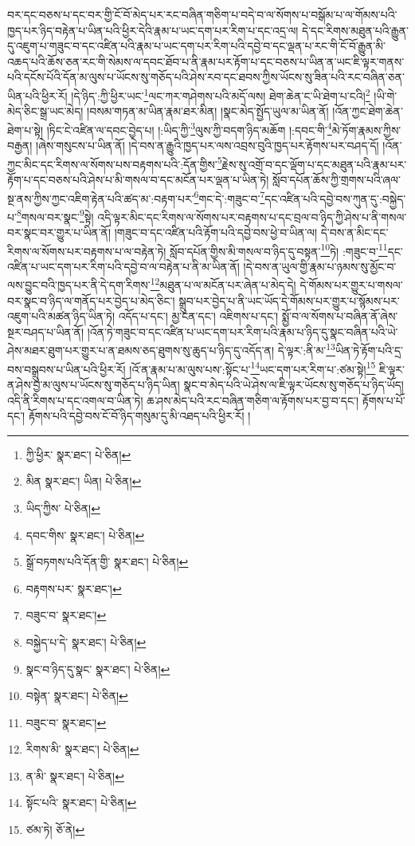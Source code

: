 བར་དང་བཅས་པ་དང་བར་གྱི་ངོ་བོ་མེད་པར་རང་བཞིན་གཅིག་པ་བདེ་བ་ལ་སོགས་པ་བསྒོམ་པ་ལ་གོམས་པའི་ཁྱད་པར་ཉིད་བརྟེན་པ་ཡིན་པའི་ཕྱིར་དེའི་རྣམ་པ་ཡང་དག་པར་རིག་པ་དང་འདྲ་ལ། དེ་དང་རིགས་མཐུན་པའི་རྒྱུན་དུ་འཇུག་པ་གཟུང་བ་དང་འཛིན་པའི་རྣམ་པ་ཡང་དག་པར་རིག་པའི་དབྱེ་བ་དང་ལྡན་པ་རང་གི་ངོ་བོ་རྒྱུན་མི་འཆད་པའི་ཆོས་ཅན་རང་གི་སེམས་ལ་དབང་ཐོབ་པ་ནི་རྣམ་པར་རྟོག་པ་དང་བཅས་པ་ཡིན་ན་ཡང་ཇི་ལྟར་གནས་པའི་དངོས་པོའི་དོན་མ་ལུས་པ་ཡོངས་སུ་གཅོད་པའི་ཤེས་རབ་དང་ཐབས་ཀྱིས་ཡོངས་སུ་ཟིན་པའི་རང་བཞིན་ཅན་ཡིན་པའི་ཕྱིར་རོ། །དེ་ཉིད་:ཀྱི་ཕྱིར་ཡང་\footnote{ཀྱི་ཕྱིར་  སྣར་ཐང་།  པེ་ཅིན། }ལང་ཀར་གཤེགས་པའི་མདོ་ལས། ཐེག་ཆེན་ང་ཡི་ཐེག་པ་ངའི།\footnote{མིན  སྣར་ཐང་། ཡིན།  པེ་ཅིན། } །ཡི་གེ་མེད་ཅིང་སྒྲ་ཡང་མེད། །བསམ་གཏན་མ་ཡིན་རྣམ་ཐར་མིན། །སྣང་མེད་སྤྱོད་ཡུལ་མ་ཡིན་ནོ། །འོན་ཀྱང་ཐེག་ཆེན་ཐེག་པ་སྟེ། །ཏིང་ངེ་འཛིན་ལ་དབང་བྱེད་པ། །:ཡིད་ཀྱི་\footnote{ཡིད་ཀྱིས་  པེ་ཅིན། }ལུས་ཀྱི་བདག་ཉིད་མཆོག །:དབང་གི་\footnote{དབང་གིས་  སྣར་ཐང་།  པེ་ཅིན། }མེ་ཏོག་རྣམས་ཀྱིས་བརྒྱན། །ཞེས་གསུངས་པ་ཡིན་ནོ། །དེ་བས་ན་རྒྱུའི་ཁྱད་པར་ལས་འབྲས་བུའི་ཁྱད་པར་རྟོགས་པར་བཤད་དོ། །འོན་ཀྱང་མིང་དང་རིགས་ལ་སོགས་པས་བརྟགས་པའི་:དོན་གྱིས་\footnote{སྒྲོ་བཏགས་པའི་དོན་གྱི་  སྣར་ཐང་།  པེ་ཅིན། }རྗེས་སུ་འགྲོ་བ་དང་ལྡོག་པ་དང་མཐུན་པའི་རྣམ་པར་རྟོག་པ་དང་བཅས་པའི་ཤེས་པ་མི་གསལ་བ་དང་མངོན་པར་ལྡན་པ་ཡིན་ཏེ། སློབ་དཔོན་ཆོས་ཀྱི་གྲགས་པའི་ཞལ་སྔ་ནས་ཀྱིས་ཀྱང་འཇིག་རྟེན་པའི་ཚད་མ་:བརྟག་པར་\footnote{བརྟགས་པར་  སྣར་ཐང་། }གང་དེ་:གཟུང་བ་\footnote{བཟུང་བ་  སྣར་ཐང་། }དང་འཛིན་པའི་དབྱེ་བས་ཀུན་དུ་:བསྐྱེད་པ་\footnote{བསྐྱེད་པ་དེ་  སྣར་ཐང་།  པེ་ཅིན། }གསལ་བར་སྣང་\footnote{སྣང་བ་ཉིད་དུ་སྣང་  སྣར་ཐང་།  པེ་ཅིན། }སྟེ། འདི་ལྟར་མིང་དང་རིགས་ལ་སོགས་པར་བརྟགས་པ་དང་བྲལ་བ་ཉིད་ཀྱི་ཤེས་པ་ནི་གསལ་བར་སྣང་བར་གྱུར་པ་ཡིན་ནོ། །གཟུང་བ་དང་འཛིན་པའི་རྟོག་པའི་དབྱེ་བས་ཕྱེ་བ་ཡིན་ལ། དེ་བས་ན་མིང་དང་རིགས་ལ་སོགས་པར་བརྟགས་པ་ལ་བརྟེན་ཏེ། སློབ་དཔོན་གྱིས་མི་གསལ་བ་ཉིད་དུ་བསྟན་\footnote{བསྟེན་  སྣར་ཐང་།  པེ་ཅིན། }ཏེ། :གཟུང་བ་\footnote{བཟུང་བ་  སྣར་ཐང་། }དང་འཛིན་པ་ཡང་དག་པར་རིག་པའི་དབྱེ་བ་ལ་བརྟེན་པ་ནི་མ་ཡིན་ནོ། །དེ་བས་ན་ཡུལ་གྱི་རྣམ་པ་ཉམས་སུ་མྱོང་བ་ལས་བྱུང་བའི་ཁྱད་པར་ནི་དེ་དག་རིགས་\footnote{རིགས་མི་  སྣར་ཐང་།  པེ་ཅིན། }མཐུན་པ་ལ་མངོན་པར་ཞེན་པ་མེད་དེ། དེ་གོམས་པར་གྱུར་པ་གསལ་བར་སྣང་བ་ཉིད་ལ་གནོད་པར་བྱེད་པ་མེད་ཅིང་། སྒྲུབ་པར་བྱེད་པ་ནི་ཡང་ཡོད་དེ་གོམས་པར་གྱུར་པ་སྙོམས་པར་འཇུག་པའི་མཚན་ཉིད་ཡིན་ཏེ། འདོད་པ་དང་། མྱ་ངན་དང་། འཇིགས་པ་དང་། སྨྱོ་བ་ལ་སོགས་པ་བཞིན་ནོ་ཞེས་སྔར་བཤད་པ་ཡིན་ནོ། །འོན་ཏེ་གཟུང་བ་དང་འཛིན་པ་ཡང་དག་པར་རིག་པའི་རྣམ་པ་ཉིད་དུ་སྣང་བཞིན་པའི་ཡེ་ཤེས་མཐར་ཐུག་པར་གྱུར་པ་ན་ཐམས་ཅད་ཐུགས་སུ་ཆུད་པ་ཉིད་དུ་འདོད་ན། དེ་ལྟར་:ནི་མ་\footnote{ན་མི་  སྣར་ཐང་།  པེ་ཅིན། }ཡིན་ཏེ་རྟོག་པའི་དྲ་བས་བསྒྲུབས་པ་ཡིན་པའི་ཕྱིར་རོ། །འོ་ན་རྣམ་པ་མ་ལུས་པས་:སྟོང་པ་\footnote{སྟོང་པའི་  སྣར་ཐང་།  པེ་ཅིན། }ཡང་དག་པར་རིག་པ་:ཙམ་སྟེ།\footnote{ཙམ་ཏེ།  ཅོ་ནེ། } ཇི་ལྟར་ན་ཤེས་བྱ་མ་ལུས་པ་ཡོངས་སུ་གཅོད་པ་ཉིད་ཡིན། སྣང་བ་མེད་པའི་ཡེ་ཤེས་ལ་ཇི་ལྟར་ཡོངས་སུ་གཅོད་པ་ཉིད་ཡོད། འདི་ནི་རིགས་པ་དང་འགལ་བ་ཡིན་ཏེ། ཆ་ཤས་མེད་པའི་རང་བཞིན་གཅིག་ལ་རྟོགས་པར་བྱ་བ་དང་། རྟོགས་པ་པོ་དང་། རྟོགས་པའི་དབྱེ་བས་ངོ་བོ་ཉིད་གསུམ་དུ་མི་འཐད་པའི་ཕྱིར་རོ། །
